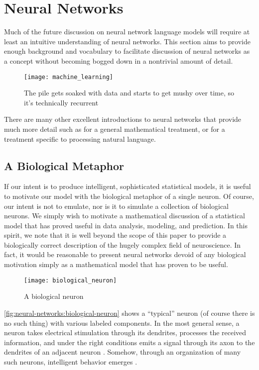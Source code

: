 \section{Neural Networks}\label{sec:introduction:neural-networks}

Much of the future discussion on neural network language models will require at least an intuitive understanding of neural networks.
This section aims to provide enough background and vocabulary to facilitate discussion of neural networks as a concept without becoming bogged down in a nontrivial amount of detail.
\begin{figure}[h]
    \centering
    \texttt{[image: machine\_learning]}
    \caption{The pile gets soaked with data and starts to get mushy over time, so it's technically recurrent \cite{xkcd_machine_learning}}\label{fig:neural-networks:xkcd-machine-learning}
\end{figure}
There are many other excellent introductions to neural networks that provide much more detail such as \cite{goodfellow_bengio_courville_2016} for a general mathematical treatment, or \cite{goldberg_2017} for a treatment specific to processing natural language.

\subsection{A Biological Metaphor}\label{sec:neural-networks-biological-metaphor}

If our intent is to produce intelligent, sophisticated statistical models, it is useful to motivate our model with the biological metaphor of a single neuron.
Of course, our intent is not to emulate, nor is it to simulate a collection of biological neurons.
We simply wish to motivate a mathematical discussion of a statistical model that has proved useful in data analysis, modeling, and prediction.
In this spirit, we note that it is well beyond the scope of this paper to provide a biologically correct description of the hugely complex field of neuroscience.
In fact, it would be reasonable to present neural networks devoid of any biological motivation simply as a mathematical model that has proven to be useful.
\begin{figure}[h]
    \centering
    \texttt{[image: biological\_neuron]}
    \caption{A biological neuron \cite{bio_neuron}}\label{fig:neural-networks:biological-neuron}
\end{figure}
\autoref{fig:neural-networks:biological-neuron} shows a ``typical'' neuron (of course there is no such thing) with various labeled components.
In the most general sense, a neuron takes electrical stimulation through its dendrites, processes the received information, and under the right conditions emits a signal through its axon to the dendrites of an adjacent neuron \cite{bio_neuron}.
Somehow, through an organization of many such neurons, intelligent behavior emerges \cite{castro_2006}.

